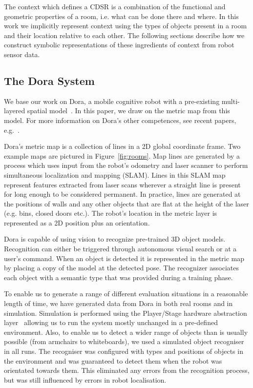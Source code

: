 \documentclass[letterpaper]{article}
\begin{document}
The context which defines a CDSR is a combination of the functional and geometric properties of a room, i.e. what can be done there and where. In this work we implicitly represent context using the types of objects present in a room and their location relative to each other. The following sections describe how we construct symbolic representations of these ingredients of context from robot sensor data. 

\subsection{The Dora System}

We base our work on Dora, a mobile cognitive robot with a pre-existing multi-layered spatial model~\cite{Hawes/etal:2011}. In this paper, we draw on the metric map from this model. For more information on Dora's other competences, see recent papers, e.g.~\cite{Hawes/etal:2011,Hanheide/etal:2011}.

Dora's metric map is a collection of lines in a 2D global coordinate frame. Two example maps are pictured in Figure~\ref{fig:rooms}. Map lines are generated by a process which uses input from the robot's odometry and laser scanner to perform simultaneous localization and mapping (SLAM). Lines in this SLAM map represent features extracted from laser scans wherever a straight line is present for long enough to be considered permanent. In practice, lines are generated at the positions of walls and any other objects that are flat at the height of the laser (e.g. bins, closed doors etc.). The robot's location in the metric layer is represented as a 2D position plus an orientation. 

Dora is capable of using vision to recognize pre-trained 3D object models. Recognition can either be triggered through autonomous visual search or at a user's command. When an object is detected it is represented in the metric map 
by placing a copy of the model at the detected pose. The recognizer associates each object with a semantic type that was provided during a training phase.

To enable us to generate a range of different evaluation situations in a reasonable length of time, we have generated data from Dora in both real rooms and in simulation. Simulation is performed using the Player/Stage hardware abstraction layer~\cite{GerkeyVaughanHoward03} allowing us to run the system mostly unchanged in a pre-defined environment. Also, to enable us to detect a wider range of objects than is usually possible (from armchairs to whiteboards), we used a simulated object recogniser in all runs. The recogniser was configured with types and positions of objects in the environment and was guaranteed to detect them when the robot was orientated towards them. This eliminated any errors from the recognition process, but was still influenced by errors in robot localisation.
\end{document}
